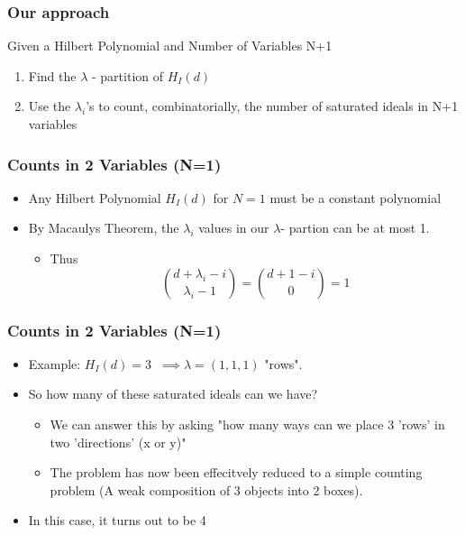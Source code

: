 \documentclass{beamer}
\begin{document}
\begin{frame}
	\frametitle{Our approach}
	Given a Hilbert Polynomial and Number of Variables N+1
	\begin{enumerate}
	\item Find the $\lambda$ - partition of $H_I(d)$ 
	\item Use the $\lambda_i$'s to count, combinatorially, the number of saturated ideals in N+1 variables
	\end{enumerate}
\end{frame}

\begin{frame}
	\frametitle{Counts in 2 Variables (N=1)}
	\begin{itemize}
	\item Any Hilbert Polynomial $H_I(d)$ for $N=1$ must be a constant polynomial
	\item By Macaulys Theorem, the $\lambda_i$ values in our $\lambda$- partion can be at most 1.
	\begin{itemize}
		\item Thus \[ \binom{d+\lambda_i -i}{\lambda_i-1} = \binom{d+1-i}{0} =1
		\]
	\end{itemize}
	\end{itemize}
\end{frame}

\begin{frame}
	\frametitle{Counts in 2 Variables (N=1)}
	\begin{itemize}
	\item Example: $H_I(d)=3 \;\; \implies \lambda = (1,1,1) $ \; "rows".
	\item So how many of these saturated ideals can we have?
	\begin{itemize}
		\item We can answer this by asking "how many ways can we place 3 'rows' in two 'directions' (x or y)"
		\item The problem has now been effecitvely reduced to a simple counting problem (A weak composition of 3 objects into 2 boxes).
	\end{itemize}
	\item In this case, it turns out to be 4 

	\end{itemize}
\end{frame}
\end{document}
